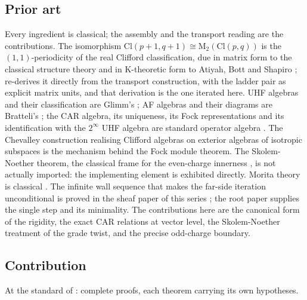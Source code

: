 \documentclass[11pt]{article}
\theoremstyle{definition}
\newcommand{\Cl}{\mathrm{Cl}}
\newcommand{\Mat}{\mathrm{M}}
\begin{document}
\subsection*{Prior art}

Every ingredient is classical; the assembly and the transport reading are the contributions. The isomorphism $\Cl(p{+}1,q{+}1) \cong \Mat_2(\Cl(p,q))$ is the $(1,1)$-periodicity of the real Clifford classification, due in matrix form to the classical structure theory \cite{Porteous1995, Lounesto2001} and in K-theoretic form to Atiyah, Bott and Shapiro \cite{ABS1964}; \cite{ButlerT1} re-derives it directly from the transport construction, with the ladder pair as explicit matrix units, and that derivation is the one iterated here. UHF algebras and their classification are Glimm's \cite{Glimm1960}; AF algebras and their diagrams are Bratteli's \cite{Bratteli1972}; the CAR algebra, its uniqueness, its Fock representations and its identification with the $2^\infty$ UHF algebra are standard operator algebra \cite{BratteliRobinson1997}. The Chevalley construction realising Clifford algebras on exterior algebras of isotropic subspaces \cite{Chevalley1997} is the mechanism behind the Fock module theorem. The Skolem-Noether theorem, the classical frame for the even-charge innerness \cite{Pierce1982}, is not actually imported: the implementing element is exhibited directly. Morita theory is classical \cite{Lam1999}. The infinite wall sequence that makes the far-side iteration unconditional is proved in the sheaf paper of this series \cite{ButlerT4}; the root paper \cite{ButlerT1} supplies the single step and its minimality. The contributions here are the canonical form of the rigidity, the exact CAR relations at vector level, the Skolem-Noether treatment of the grade twist, and the precise odd-charge boundary.

\subsection*{Contribution}

At the standard of \cite{ButlerT1}: complete proofs, each theorem carrying its own hypotheses.
\end{document}
